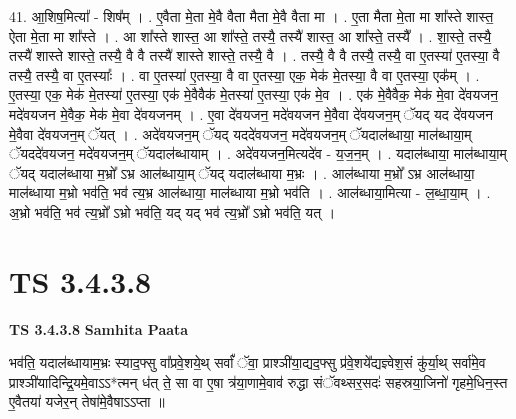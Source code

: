 \documentclass[17pt]{extarticle}
\begin{document}
41. आ॒शिष॒मित्या᳚ - शिष᳚म् । . ए॒वैता मे॒ता मे॒वै वैता मैता मे॒वै वैता मा । . ए॒ता मैता मे॒ता मा शा᳚स्ते शास्त॒ ऐता मे॒ता मा शा᳚स्ते । . आ शा᳚स्ते शास्त॒ आ शा᳚स्ते॒ तस्यै॒ तस्यै॑ शास्त॒ आ शा᳚स्ते॒ तस्यै᳚ । . शा॒स्ते॒ तस्यै॒ तस्यै॑ शास्ते शास्ते॒ तस्यै॒ वै वै तस्यै॑ शास्ते शास्ते॒ तस्यै॒ वै । . तस्यै॒ वै वै तस्यै॒ तस्यै॒ वा ए॒तस्या॑ ए॒तस्या॒ वै तस्यै॒ तस्यै॒ वा ए॒तस्याः᳚ । . वा ए॒तस्या॑ ए॒तस्या॒ वै वा ए॒तस्या॒ एक॒ मेक॑ मे॒तस्या॒ वै वा ए॒तस्या॒ एक᳚म् । . ए॒तस्या॒ एक॒ मेक॑ मे॒तस्या॑ ए॒तस्या॒ एक॑ मे॒वैवैक॑ मे॒तस्या॑ ए॒तस्या॒ एक॑ मे॒व । . एक॑ मे॒वैवैक॒ मेक॑ मे॒वा दे॑वयजन॒ मदे॑वयजन मे॒वैक॒ मेक॑ मे॒वा दे॑वयजनम् । . ए॒वा दे॑वयजन॒ मदे॑वयजन मे॒वैवा दे॑वयजन॒म् ॅयद् यद दे॑वयजन मे॒वैवा दे॑वयजन॒म् ॅयत् । . अदे॑वयजन॒म् ॅयद् यददे॑वयजन॒ मदे॑वयजन॒म् ॅयदाल॑ब्धाया॒ माल॑ब्धाया॒म् ॅयददे॑वयजन॒ मदे॑वयजन॒म् ॅयदाल॑ब्धायाम् । . अदे॑वयजन॒मित्यदे॑व - य॒ज॒न॒म् । . यदाल॑ब्धाया॒ माल॑ब्धाया॒म् ॅयद् यदाल॑ब्धाया म॒भ्रो᳚ ऽभ्र आल॑ब्धाया॒म् ॅयद् यदाल॑ब्धाया म॒भ्रः । . आल॑ब्धाया म॒भ्रो᳚ ऽभ्र आल॑ब्धाया॒ माल॑ब्धाया म॒भ्रो भव॑ति॒ भव॑ त्य॒भ्र आल॑ब्धाया॒ माल॑ब्धाया म॒भ्रो भव॑ति । . आल॑ब्धाया॒मित्या - ल॒ब्धा॒या॒म् । . अ॒भ्रो भव॑ति॒ भव॑ त्य॒भ्रो᳚ ऽभ्रो भव॑ति॒ यद् यद् भव॑ त्य॒भ्रो᳚ ऽभ्रो भव॑ति॒ यत् । \newline
\pagebreak
{}

\section{ TS 3.4.3.8 }

\textbf{TS 3.4.3.8 } \newline
\textbf{Samhita Paata} \newline

भव॑ति॒ यदाल॑ब्धायाम॒भ्रः स्याद॒फ्सु वा᳚प्रवे॒शये॒थ् सर्वां᳚ ॅवा॒ प्राश्ञी॑या॒द्यद॒फ्सु प्र॑वे॒शये᳚द्यज्ञ्वेश॒सं कु॑र्या॒थ् सर्वा॑मे॒व प्राश्ञी॑यादिन्द्रि॒यमे॒वाऽऽ*त्मन् ध॑त् ते॒ सा वा ए॒षा त्र॑या॒णामे॒वाव॑ रुद्धा संॅवथ्सर॒सदः॑ सहस्रया॒जिनो॑ गृहमे॒धिन॒स्त ए॒वैतया॑ यजेर॒न् तेषा॑मे॒वैषाऽऽप्ता ॥ \newline
\end{document}

